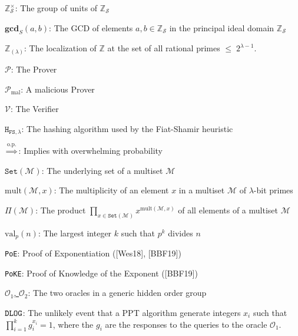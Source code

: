 \documentclass[11pt, lettersize, notitlepage, leqno, footskip=0.6cm]{article}
\newcommand{\bz}{\mathbb Z}
\newcommand{\pl}{\prod\limits}
\newcommand{\ttt}{\texttt}
\newcommand{\sett}{\ttt{Set}}
\newcommand{\mc}{\mathcal}
\newcommand{\mbf}{\mathbf}
\newcommand{\mr}{\mathrm}
\newcommand{\lam}{\lambda}
\newcommand{\bzs}{\bz_{\mc{S}}}
\newcommand{\noin}{\noindent}
\newcommand{\GCD}{\mbf{gcd}}
\numberwithin{equation}{section}
\begin{document}
{{{\noin $\bzs^{\times}$: The group of units of $\bzs$ \vspace{0.1cm}

\noin $\GCD_S(a, b)$: The GCD of elements $a,b\in \bz_{\mc{S}}$ in the principal ideal domain $\bz_{\mc{S}}$ \vspace{0.1cm}

\noin $\bz_{(\lam)}$: The localization of $\bz$ at the set of all rational primes $\leq\; 2^{\lam-1}$. \vspace{0.1cm}

\noin $\mc{P}$: The Prover \vspace{0.1cm}

\noin $\mc{P}_{\mr{mal}}$: A malicious Prover \vspace{0.1cm}

\noin $\mc{V}$: The Verifier \vspace{0.1cm}

\noin $\ttt{H}_{\ttt{FS}, \lam}$: The hashing algorithm used by the Fiat-Shamir heuristic \vspace{0.1cm}

\noin $\overset{\mr{o.p.}}{\Longrightarrow}$: Implies with overwhelming probability \vspace{0.1cm}

\noin $\sett(\mc{M})$: The underlying set of a multiset $\mc{M}$ \vspace{0.1cm}

\noin $\mr{mult}(\mc{M},x)$: The multiplicity of an element $x$ in a multiset $\mc{M}$ of $\lam$-bit primes \vspace{0.1cm}

\noin $\Pi(\mc{M})$: The product $\pl_{x\in \sett(\mc{M})} x^{\mr{mult}(\mc{M},x)}$ of all elements of a multiset $\mc{M}$ \vspace{0.1cm}

\noin $\mr{val}_p(n)$: The largest integer $k$ such that $p^k$ divides $n$ \vspace{0.1cm}

\noin \verb|PoE|: Proof of Exponentiation ([Wes18], [BBF19])\vspace{0.1cm}

\noin \verb|PoKE|: Proof of Knowledge of the Exponent ([BBF19]) \vspace{0.1cm}

\noin \hyperlink{Oracles}{$\mc{O}_1$, $\mc{O}_2$}: The two oracles in a generic hidden order group \vspace{0.1cm}

\noin \hyperlink{DLOG}{$\tt{DLOG}$}: The unlikely event that a PPT algorithm generate integers $x_i$ such that $\prod_{i=1}^k g_i^{x_i} = 1$, where the $g_i$ are the responses to the queries to the oracle $\mc{O}_1.$

}}}
\end{document}
